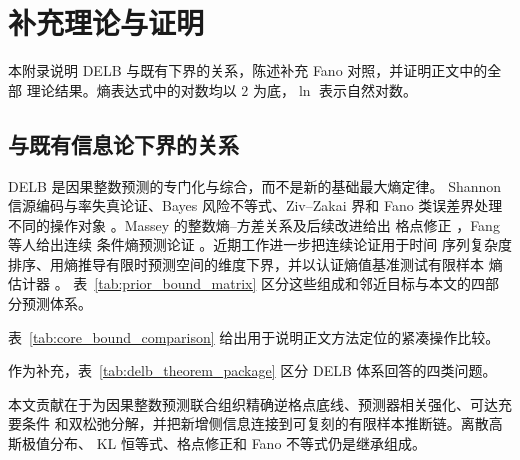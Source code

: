 \section{补充理论与证明}
\label{app:proofs}

\makeatletter
{}
\makeatother

本附录说明 DELB 与既有下界的关系，陈述补充 Fano 对照，并证明正文中的全部
理论结果。熵表达式中的对数均以 \(2\) 为底，\(\ln\) 表示自然对数。

\subsection{与既有信息论下界的关系}
\label{subsec:prior_bound_scope}

DELB 是因果整数预测的专门化与综合，而不是新的基础最大熵定律。
Shannon 信源编码与率失真论证、Bayes 风险不等式、Ziv--Zakai 界和
Fano 类误差界处理不同的操作对象
\citep{shannon1948,shannon_rate_distortion,chen_bayes_risk,
jeong_ziv_zakai,feder_merhav}。Massey 的整数熵--方差关系及后续改进给出
格点修正 \citep{massey_integer_entropy,rioul_massey}，Fang 等人给出连续
条件熵预测论证 \citep{fang_variance_bounds}。近期工作进一步把连续论证用于时间
序列复杂度排序、用熵推导有限时预测空间的维度下界，并以认证熵值基准测试有限样本
熵估计器 \citep{ayers2025complexity,hauser2026dmd,calcagnile2026benchmark}。
表~\ref{tab:prior_bound_matrix} 区分这些组成和邻近目标与本文的四部分预测体系。



表~\ref{tab:core_bound_comparison} 给出用于说明正文方法定位的紧凑操作比较。



作为补充，表~\ref{tab:delb_theorem_package} 区分 DELB 体系回答的四类问题。



\begin{Remark}[贡献层次]
\label{rem:claim_hierarchy}
本文贡献在于为因果整数预测联合组织精确逆格点底线、预测器相关强化、可达充要条件
和双松弛分解，并把新增侧信息连接到可复刻的有限样本推断链。离散高斯极值分布、
KL 恒等式、格点修正和 Fano 不等式仍是继承组成。
\end{Remark}


